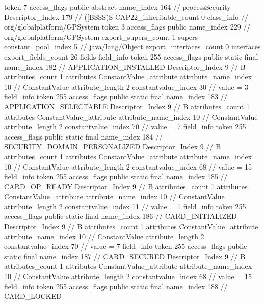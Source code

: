 {{{{{					token	7
					access_flags	public abstract
					name_index	164		// processSecurity
					Descriptor_Index	179		// ([BSSS)S
				}
			}
			CAP22_inheritable_count	0
		}
		class_info {		// org/globalplatform/GPSystem
			token	3
			access_flags	public
			name_index	229		// org/globalplatform/GPSystem
			export_supers_count	1
			supers {
				constant_pool_index	5		// java/lang/Object
			}
			export_interfaces_count	0
			interfaces {
			}
			export_fields_count	26
			fields {
			field_info {
				token	255
				access_flags	public static final
				name_index	182		// APPLICATION_INSTALLED
				Descriptor_Index	9		// B
				attributes_count	1
				attributes {
				ConstantValue_attribute {
					attribute_name_index	10		// ConstantValue
					attribute_length	2
					constantvalue_index	30		// value = 3
				}
				}
			}
			field_info {
				token	255
				access_flags	public static final
				name_index	183		// APPLICATION_SELECTABLE
				Descriptor_Index	9		// B
				attributes_count	1
				attributes {
				ConstantValue_attribute {
					attribute_name_index	10		// ConstantValue
					attribute_length	2
					constantvalue_index	70		// value = 7
				}
				}
			}
			field_info {
				token	255
				access_flags	public static final
				name_index	184		// SECURITY_DOMAIN_PERSONALIZED
				Descriptor_Index	9		// B
				attributes_count	1
				attributes {
				ConstantValue_attribute {
					attribute_name_index	10		// ConstantValue
					attribute_length	2
					constantvalue_index	68		// value = 15
				}
				}
			}
			field_info {
				token	255
				access_flags	public static final
				name_index	185		// CARD_OP_READY
				Descriptor_Index	9		// B
				attributes_count	1
				attributes {
				ConstantValue_attribute {
					attribute_name_index	10		// ConstantValue
					attribute_length	2
					constantvalue_index	11		// value = 1
				}
				}
			}
			field_info {
				token	255
				access_flags	public static final
				name_index	186		// CARD_INITIALIZED
				Descriptor_Index	9		// B
				attributes_count	1
				attributes {
				ConstantValue_attribute {
					attribute_name_index	10		// ConstantValue
					attribute_length	2
					constantvalue_index	70		// value = 7
				}
				}
			}
			field_info {
				token	255
				access_flags	public static final
				name_index	187		// CARD_SECURED
				Descriptor_Index	9		// B
				attributes_count	1
				attributes {
				ConstantValue_attribute {
					attribute_name_index	10		// ConstantValue
					attribute_length	2
					constantvalue_index	68		// value = 15
				}
				}
			}
			field_info {
				token	255
				access_flags	public static final
				name_index	188		// CARD_LOCKED
}}}}}
